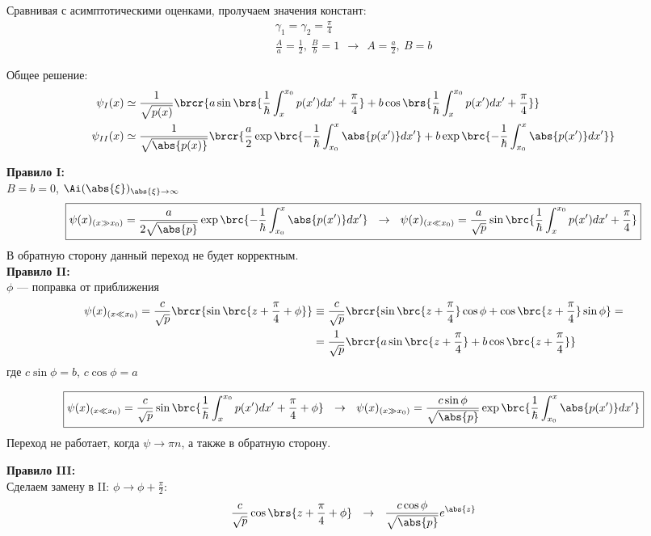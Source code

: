Сравнивая с асимптотическими оценками, пролучаем значения констант:
$$
\begin{gathered}
\gamma_1 = \gamma_2 = \frac{\pi}{4}\\
\frac{A}{a} = \frac{1}{2},~ \frac{B}{b} = 1 ~~\rightarrow~~ \boxed{A = \frac{a}{2},~ B = b}
\end{gathered}
$$

Общее решение:
$$
\begin{aligned}
\psi_{I}(x) &\simeq \frac{1}{\sqrt{p(x)}} \brcr{ a \sin\brs{\frac{1}{\hbar} \int_x^{x_0} p(x')dx'+\frac{\pi}{4}} + b \cos\brs{\frac{1}{\hbar} \int_x^{x_0} p(x')dx'+\frac{\pi}{4}} } \\
\psi_{II}(x) &\simeq \frac{1}{\sqrt{\abs{p(x)}}} \brcr{ \frac{a}{2} \exp\brc{-\frac{1}{\hbar} \int^x_{x_0} \abs{p(x')}dx'} + b \exp\brc{-\frac{1}{\hbar} \int^x_{x_0} \abs{p(x')}dx'} }
\end{aligned}
$$

\textbf{Правило I:} \\
$B = b = 0$, $\Ai(\abs{\xi})_{\abs{\xi} \to \infty}$
$$
\boxed{
	\psi(x)_{(x \gg x_0)} = \frac{a}{2 \sqrt{\abs{p}}} \exp\brc{-\frac{1}{\hbar} \int_{x_0}^{x} \abs{p(x')}dx'} ~~\rightarrow~~
	\psi(x)_{(x \ll x_0)} = \frac{a}{\sqrt{p}} \sin\brc{\frac{1}{\hbar} \int_{x}^{x_0} p(x')dx' + \frac{\pi}{4}}
}
$$
В обратную сторону данный переход не будет корректным.
\\

\textbf{Правило II:} \\
$\phi$ --- поправка от приближения
$$
\begin{aligned}
\psi(x)_{(x \ll x_0)} = \frac{c}{\sqrt{p}} \brcr{\sin\brc{z+\frac{\pi}{4}+\phi}} &\equiv
\frac{c}{\sqrt{p}} \brcr{\sin\brc{z+\frac{\pi}{4}}\cos{\phi} + \cos\brc{z+\frac{\pi}{4}}\sin{\phi}} =\\
&=\frac{1}{\sqrt{p}} \brcr{a \sin\brc{z+\frac{\pi}{4}} + b \cos\brc{z+\frac{\pi}{4}}}
\end{aligned}
$$
где $c\sin{\phi}=b$, $c\cos{\phi}=a$

$$
\boxed{
	\psi(x)_{(x \ll x_0)} = \frac{c}{\sqrt{p}} \sin\brc{\frac{1}{\hbar} \int_{x}^{x_0} p(x')dx' + \frac{\pi}{4} + \phi} ~~\rightarrow~~
	\psi(x)_{(x \gg x_0)} = \frac{c \sin{\phi}}{\sqrt{\abs{p}}} \exp\brc{\frac{1}{\hbar} \int_{x_0}^{x} \abs{p(x')}dx'}
}
$$
Переход не работает, когда $\psi \to \pi n$, а также в обратную сторону.

\textbf{Правило III:} \\
Сделаем замену в II: $\phi \to \phi + \frac{\pi}{2}$:
$$
\frac{c}{\sqrt{p}}\cos\brs{z+\frac{\pi}{4} + \phi} ~~\rightarrow~~ \frac{c\cos{\phi}}{\sqrt{\abs{p}}} e^{\abs{z}}
$$

